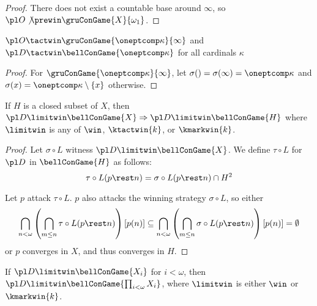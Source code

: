 \begin{proof}
  There does not exist a countable base around $\infty$, so
    $\pl O \not\prewin \gruConGame{X}{\omega_1}$.
\end{proof}

\begin{ex}
  $\pl O \tactwin \gruConGame{\oneptcomp\kappa}{\infty}$ and
  $\pl D \tactwin \bellConGame{\oneptcomp\kappa}$ for all cardinals $\kappa$
\end{ex}

\begin{proof}
  For $\gruConGame{\oneptcomp\kappa}{\infty}$, let
    $\sigma()=\sigma(\infty)=\oneptcomp\kappa$
  and
    $\sigma(x)=\oneptcomp\kappa\setminus\{x\}$
  otherwise.
\end{proof}


\newpage

\begin{thm}
  If $H$ is a closed subset of $X$, then
    $
      \pl D \limitwin \bellConGame{X}
        \Rightarrow
      \pl D \limitwin \bellConGame{H}
    $
  where $\limitwin$ is any of $\win$, $\ktactwin{k}$, or $\kmarkwin{k}$.
\end{thm}

\begin{proof}
  Let $\sigma\circ L$ witness $\pl D \limitwin \bellConGame{X}$. We define
  $\tau\circ L$ for $\pl D$ in $\bellConGame{H}$ as follows:
    \[
      \tau\circ L(p\rest n)
        =
      \sigma\circ L(p\rest n)
        \cap
      H^2
    \]

  Let $p$ attack $\tau\circ L$. $p$ also attacks the winning strategy
  $\sigma\circ L$, so either
    \[
      \bigcap_{n<\omega}
      \left(\bigcap_{m\leq n}\tau\circ L(p\rest n)\right)
      [p(n)]
        \subseteq
      \bigcap_{n<\omega}
      \left(\bigcap_{m\leq n}\sigma\circ L(p\rest n)\right)
      [p(n)]
        =
      \emptyset
    \]
  or $p$ converges in $X$, and thus converges in $H$.
\end{proof}

\begin{thm}
  If $\pl D\limitwin \bellConGame{X_i}$ for $i<\omega$, then
  $\pl D\limitwin \bellConGame{\prod_{i<\omega}X_i}$, where $\limitwin$ is either
  $\win$ or $\kmarkwin{k}$.
\end{thm}

